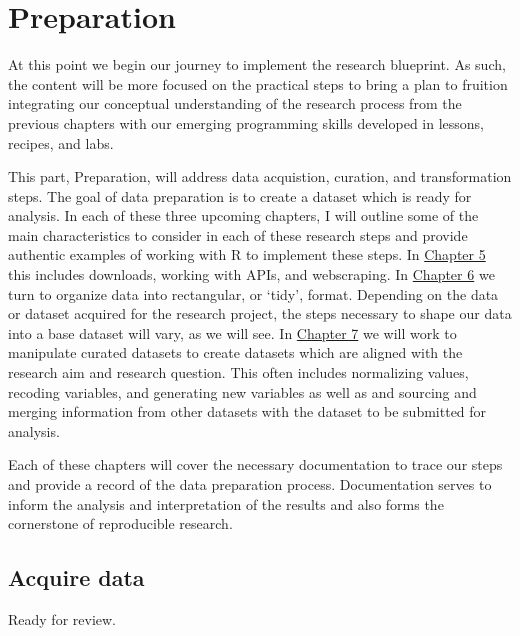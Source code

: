 \documentclass[
  letterpaper,
  DIV=11,
  numbers=noendperiod]{scrreport}
\theoremstyle{definition}
\theoremstyle{remark}
\begin{document}
\part{Preparation}

At this point we begin our journey to implement the research blueprint.
As such, the content will be more focused on the practical steps to
bring a plan to fruition integrating our conceptual understanding of the
research process from the previous chapters with our emerging
programming skills developed in lessons, recipes, and labs.

This part, Preparation, will address data acquistion, curation, and
transformation steps. The goal of data preparation is to create a
dataset which is ready for analysis. In each of these three upcoming
chapters, I will outline some of the main characteristics to consider in
each of these research steps and provide authentic examples of working
with R to implement these steps. In
\protect\hyperlink{sec-acquire-data}{Chapter 5} this includes downloads,
working with APIs, and webscraping. In
\protect\hyperlink{sec-curate-data}{Chapter 6} we turn to organize data
into rectangular, or `tidy', format. Depending on the data or dataset
acquired for the research project, the steps necessary to shape our data
into a base dataset will vary, as we will see. In
\protect\hyperlink{sec-transform-data}{Chapter 7} we will work to
manipulate curated datasets to create datasets which are aligned with
the research aim and research question. This often includes normalizing
values, recoding variables, and generating new variables as well as and
sourcing and merging information from other datasets with the dataset to
be submitted for analysis.

Each of these chapters will cover the necessary documentation to trace
our steps and provide a record of the data preparation process.
Documentation serves to inform the analysis and interpretation of the
results and also forms the cornerstone of reproducible research.

\hypertarget{sec-acquire-data}{%
\chapter{Acquire data}\label{sec-acquire-data}}

\begin{tcolorbox}[enhanced jigsaw, breakable, arc=.35mm, opacityback=0, bottomrule=.15mm, colback=white, opacitybacktitle=0.6, colframe=quarto-callout-tip-color-frame, toptitle=1mm, colbacktitle=quarto-callout-tip-color!10!white, left=2mm, leftrule=.75mm, toprule=.15mm, title=\textcolor{quarto-callout-tip-color}{\faLightbulb}\hspace{0.5em}{Draft}, bottomtitle=1mm, coltitle=black, titlerule=0mm, rightrule=.15mm]

Ready for review.

\end{tcolorbox}
\end{document}

